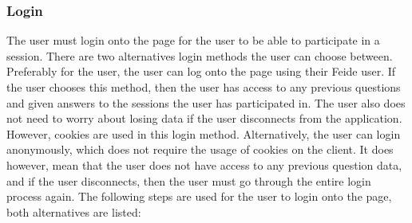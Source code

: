\subsubsection{Login}
The user must login onto the page for the user to be able to participate in a session. There are two alternatives login methods the user can choose between. Preferably for the user, the user can log onto the page using their Feide user. If the user chooses this method, then the user has access to any previous questions and given answers to the sessions the user has participated in. The user also does not need to worry about losing data if the user disconnects from the application. However, cookies are used in this login method. Alternatively, the user can login anonymously, which does not require the usage of cookies on the client. It does however, mean that the user does not have access to any previous question data, and if the user disconnects, then the user must go through the entire login process again. The following steps are used for the user to login onto the page, both alternatives are listed:
